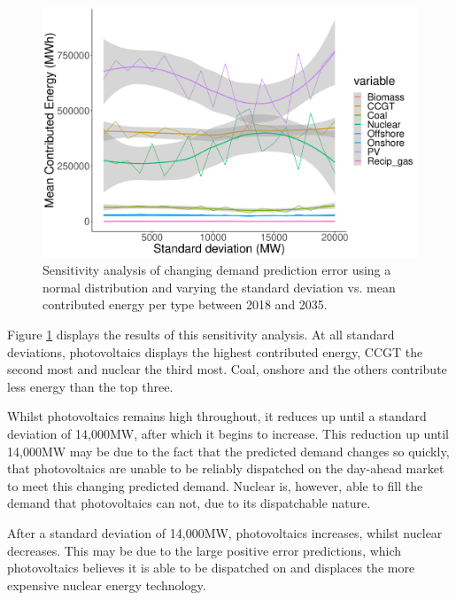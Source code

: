 \documentclass[final,3p,times,twocolumn,numbers]{elsarticle}
\begin{document}
\begin{figure}[h]
\centering
\includegraphics[width=0.8\columnwidth,natwidth=800, natheight=550]{figures/results/sensitivity_analysis.pdf}
\caption{Sensitivity analysis of changing demand prediction error using a normal distribution and varying the standard deviation vs. mean contributed energy per type between 2018 and 2035.}
\label{fig:sensitivity-analysis}
\end{figure}

Figure \ref{fig:sensitivity-analysis} displays the results of this sensitivity analysis. At all standard deviations, photovoltaics displays the highest contributed energy, CCGT the second most and nuclear the third most. Coal, onshore and the others contribute less energy than the top three.

Whilst photovoltaics remains high throughout, it reduces up until a standard deviation of 14,000MW, after which it begins to increase. This reduction up until 14,000MW may be due to the fact that the predicted demand changes so quickly, that photovoltaics are unable to be reliably dispatched on the day-ahead market to meet this changing predicted demand. Nuclear is, however, able to fill the demand that photovoltaics can not, due to its dispatchable nature.

After a standard deviation of 14,000MW, photovoltaics increases, whilst nuclear decreases. This may be due to the large positive error predictions, which photovoltaics believes it is able to be dispatched on and displaces the more expensive nuclear energy technology.




\end{document}
